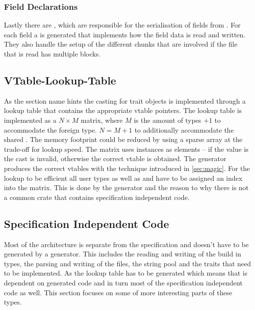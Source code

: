 \documentclass[thesis]{subfiles}
\begin{document}
    \subsubsection{Field Declarations}
      Lastly there are \FieldDeclarations, which are responsible for the serialisation of fields from \UserTypes.
      For each field a \FieldDeclaration is generated that implements how the field data is read and written.
      They also handle the setup of the different chunks that are involved if the file that is read has multiple blocks.

  \subsection{VTable-Lookup-Table}
    As the section name hints the casting for trait objects is implemented through a lookup table that contains the appropriate vtable pointers.
    The lookup table is implemented as a $N \times M$ matrix, where $M$ is the amount of types $+1$ to accommodate the foreign type.
    $N=M+1$ to additionally accommodate the shared \trait \SkillObject.
    The memory footprint could be reduced by using a sparse array at the trade-off for lookup speed.
    The matrix uses  instances as elements -- if the value is  the cast is invalid, otherwise the correct vtable is obtained.
    The generator produces the correct vtables with the technique introduced in \autoref{sec:magic}.
    For the lookup to be efficient all user types as well as  and \SkillObject have to be assigned an index into the matrix.
    This is done by the generator and the reason to why there is not a common crate that contains specification independent code.

  \subsection{Specification Independent Code}
    Most of the architecture is separate from the specification and doesn't have to be generated by a generator.
    This includes the reading and writing of the build in types, the parsing and writing of the files, the string pool and the traits that need to be implemented.
    As the lookup table has to be generated which means that \PtrT is dependent on generated code and in turn most of the specification independent code as well.
    This section focuses on some of more interesting parts of these types.
\end{document}
